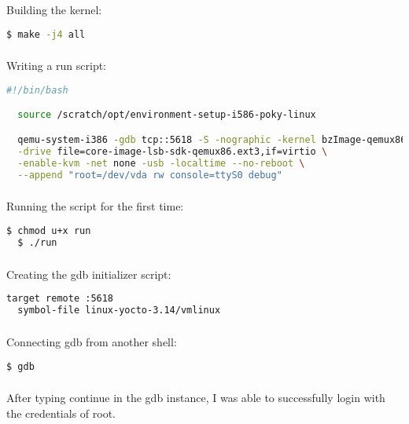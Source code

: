 \documentclass[10pt,draftclsnofoot,onecolumn]{IEEEtran}
\begin{document}
\subsubsection{}
Building the kernel:
\begin{lstlisting}[language=bash]
  $ make -j4 all
\end{lstlisting}

\subsubsection{}
Writing a run script:
\begin{lstlisting}[language=bash]
  #!/bin/bash

  source /scratch/opt/environment-setup-i586-poky-linux

  qemu-system-i386 -gdb tcp::5618 -S -nographic -kernel bzImage-qemux86.bin \
  -drive file=core-image-lsb-sdk-qemux86.ext3,if=virtio \
  -enable-kvm -net none -usb -localtime --no-reboot \
  --append "root=/dev/vda rw console=ttyS0 debug"
\end{lstlisting}

\subsubsection{}
Running the script for the first time:
\begin{lstlisting}[language=bash]
  $ chmod u+x run
  $ ./run
\end{lstlisting}

\subsubsection{}
Creating the gdb initializer script:
\begin{lstlisting}[language=bash]
  target remote :5618
  symbol-file linux-yocto-3.14/vmlinux
\end{lstlisting}

\subsubsection{}
Connecting gdb from another shell:
\begin{lstlisting}[language=bash]
  $ gdb
\end{lstlisting}

\subsubsection{}
After typing continue in the gdb instance, I was able to successfully login with the credentials of root.
\end{document}
